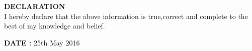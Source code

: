 \documentclass[]{article}
\begin{document}
\begin{flushleft}
\vspace{0.15in}
{\large \bf DECLARATION}\\
\vspace{0.15in}
I hereby declare that the above information is true,correct and complete to the best of my knowledge and belief.
\end{flushleft}


\begin{flushleft}
\vspace{0.15in}
{\large \bf DATE :}
\hspace{0.01in}
25th May 2016
\end{flushleft}
\end{document}
